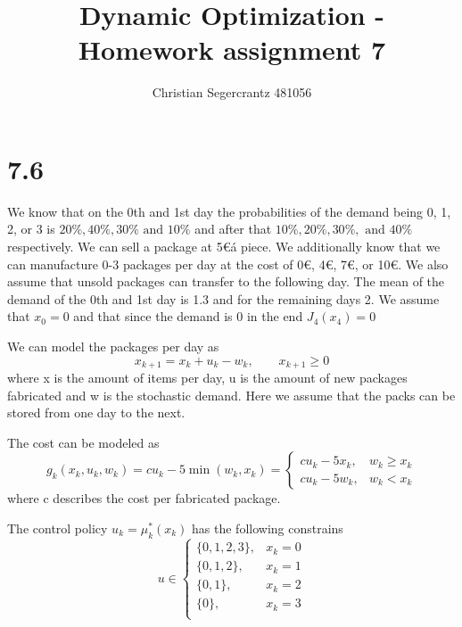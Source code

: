 \documentclass{article}
\title{Dynamic Optimization - Homework assignment 7}
\author{Christian Segercrantz 481056}
\begin{document}
	\maketitle
	\pagebreak

\section*{7.6}

We know that on the 0th and 1st day the probabilities of the demand being 0, 1, 2, or 3 is $20\%, 40\%, 30\% \text{ and } 10\%$ and after that $10\%, 20\%, 30\%, \text{ and } 40\%$ respectively. We can sell a package at 5\euro á piece. We additionally know that we can manufacture 0-3 packages per day at the cost of 0\euro, 4\euro, 7\euro, or 10\euro. We also assume that unsold packages can transfer to the following day. The mean of the demand of the 0th and 1st day is 1.3 and for the remaining days 2. We assume that $x_0 = 0$ and that since the demand is 0 in the end $J_4(x_4) = 0$

We can model the packages per day as
\begin{equation}
	x_{k+1} = x_{k} + u_k - w_k, \qquad x_{k+1}\geq 0
\end{equation}
where x is the amount of items per day, u is the amount of new packages fabricated and w is the stochastic demand. Here we assume that the packs can be stored from one day to the next. 

The cost can be modeled as 
\begin{equation}
	g_k(x_k,u_k,w_k) = c u_k - 5\min(w_k,x_k) =
	 \begin{cases}
		c u_k - 5x_k, & w_k \geq x_k\\
		c u_k - 5w_k, & w_k < x_k
	\end{cases} 
\end{equation}
where c describes the cost per fabricated package.

The control policy $u_k = \mu^*_k(x_k)$ has the following constrains
\begin{equation}
	u \in
	\begin{cases}
		\lbrace0,1,2,3\rbrace, &x_k = 0\\
		\lbrace0,1,2\rbrace, &x_k = 1\\
		\lbrace0,1\rbrace, &x_k = 2\\
		\lbrace0\rbrace, &x_k = 3\\	
	\end{cases}
\end{equation}
\end{document}
